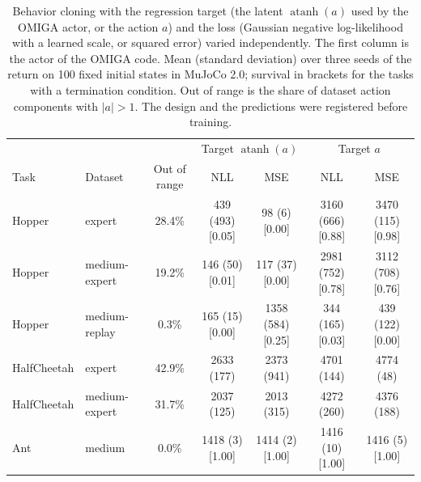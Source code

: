 \begin{table}[t]
\centering
\caption{Behavior cloning with the regression target (the latent $\operatorname{atanh}(a)$ used by the OMIGA actor, or the action $a$) and the loss (Gaussian negative log-likelihood with a learned scale, or squared error) varied independently. The first column is the actor of the OMIGA code. Mean (standard deviation) over three seeds of the return on 100 fixed initial states in MuJoCo 2.0; survival in brackets for the tasks with a termination condition. Out of range is the share of dataset action components with $|a|>1$. The design and the predictions were registered before training.}
\label{tab:param2x2}
\begin{tabular*}{\textwidth}{@{\extracolsep{\fill}}llccccc}
\hline
 & & & \multicolumn{2}{c}{Target $\operatorname{atanh}(a)$} & \multicolumn{2}{c}{Target $a$} \\
Task & Dataset & Out of range & NLL & MSE & NLL & MSE \\
\hline
Hopper & expert & 28.4\% & 439 (493) [0.05] & 98 (6) [0.00] & 3160 (666) [0.88] & 3470 (115) [0.98] \\
Hopper & medium-expert & 19.2\% & 146 (50) [0.01] & 117 (37) [0.00] & 2981 (752) [0.78] & 3112 (708) [0.76] \\
Hopper & medium-replay & 0.3\% & 165 (15) [0.00] & 1358 (584) [0.25] & 344 (165) [0.03] & 439 (122) [0.00] \\
HalfCheetah & expert & 42.9\% & 2633 (177) & 2373 (941) & 4701 (144) & 4774 (48) \\
HalfCheetah & medium-expert & 31.7\% & 2037 (125) & 2013 (315) & 4272 (260) & 4376 (188) \\
Ant & medium & 0.0\% & 1418 (3) [1.00] & 1414 (2) [1.00] & 1416 (10) [1.00] & 1416 (5) [1.00] \\
\hline
\end{tabular*}
\end{table}
